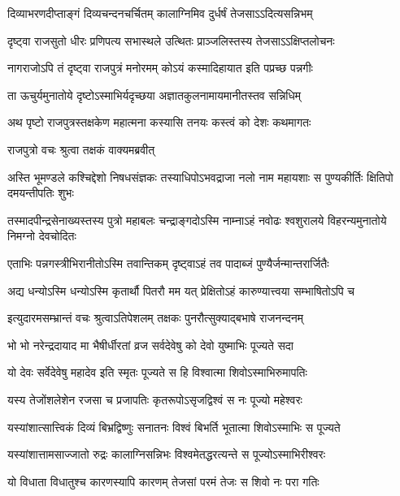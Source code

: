\begin{center}
\twolineshloka
{दिव्याभरणदीप्ताङ्गं दिव्यचन्दनचर्चितम्}
{कालाग्निमिव दुर्धर्षं तेजसाऽऽदित्यसन्निभम्} %

\twolineshloka
{दृष्ट्वा राजसुतो धीरः प्रणिपत्य सभास्थले}
{उत्थितः प्राञ्जलिस्तस्य तेजसाऽऽक्षिप्तलोचनः} %

\twolineshloka
{नागराजोऽपि तं दृष्ट्वा राजपुत्रं मनोरमम्}
{कोऽयं कस्मादिहायात इति पप्रच्छ पन्नगीः} %

\twolineshloka
{ता ऊचुर्यमुनातोये दृष्टोऽस्माभिर्यदृच्छया}
{अज्ञातकुलनामायमानीतस्तव सन्निधिम्} %

\twolineshloka
{अथ पृष्टो राजपुत्रस्तक्षकेण महात्मना}
{कस्यासि तनयः कस्त्वं को देशः कथमागतः} %

\onelineshloka
{राजपुत्रो वचः श्रुत्वा तक्षकं वाक्यमब्रवीत्} %

\threelineshloka
{अस्ति भूमण्डले कश्चिद्देशो निषधसंज्ञकः}
{तस्याधिपोऽभवद्राजा नलो नाम महायशाः}
{स पुण्यकीर्तिः क्षितिपो दमयन्तीपतिः शुभः} %

\threelineshloka
{तस्मादपीन्द्रसेनाख्यस्तस्य पुत्रो महाबलः}
{चन्द्राङ्गदोऽस्मि नाम्नाऽहं नवोढः श्वशुरालये}
{विहरन्यमुनातोये निमग्नो देवचोदितः} %

\twolineshloka
{एताभिः पन्नगस्त्रीभिरानीतोऽस्मि तवान्तिकम्}
{दृष्ट्वाऽहं तव पादाब्जं पुण्यैर्जन्मान्तरार्जितैः} %

\twolineshloka
{अद्य धन्योऽस्मि धन्योऽस्मि कृतार्थौ पितरौ मम}
{यत् प्रेक्षितोऽहं कारुण्यात्त्वया सम्भाषितोऽपि च} %

\twolineshloka
{इत्युदारमसम्भ्रान्तं वचः श्रुत्वाऽतिपेशलम्}
{तक्षकः पुनरौत्सुक्याद्बभाषे राजनन्दनम्} %

\twolineshloka
{भो भो नरेन्द्रदायाद मा भैषीर्धीरतां व्रज}
{सर्वदेवेषु को देवो युष्माभिः पूज्यते सदा} %

\twolineshloka
{यो देवः सर्वेदेवेषु महादेव इति स्मृतः}
{पूज्यते स हि विश्वात्मा शिवोऽस्माभिरुमापतिः} %

\twolineshloka
{यस्य तेजोंशलेशेन रजसा च प्रजापतिः}
{कृतरूपोऽसृजद्विश्वं स नः पूज्यो महेश्वरः} %

\twolineshloka
{यस्यांशात्सात्त्विकं दिव्यं बिभ्रद्विष्णुः सनातनः}
{विश्वं बिभर्ति भूतात्मा शिवोऽस्माभिः स पूज्यते} %

\twolineshloka
{यस्यांशात्तामसाज्जातो रुद्रः कालाग्निसन्निभः}
{विश्वमेतद्धरत्यन्ते स पूज्योऽस्माभिरीश्वरः} %

\twolineshloka
{यो विधाता विधातुश्च कारणस्यापि कारणम्}
{तेजसां परमं तेजः स शिवो नः परा गतिः} %


\end{center}
